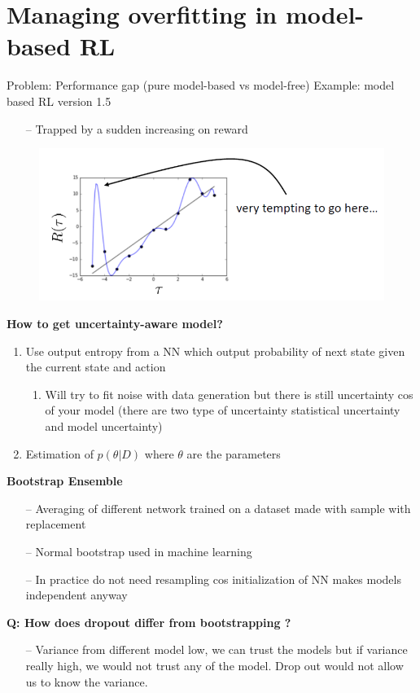 \documentclass{article}
\begin{document}
\section{Managing overfitting in model-based RL}
Problem: Performance gap (pure model-based vs model-free)
Example: model based RL version 1.5
\begin{itemize}
\item[--] Trapped by a sudden increasing on reward
\end{itemize}
\begin{figure}[h]
    \centering
        \includegraphics[width=0.7\linewidth]{img/tp.png}
    \label{fig:tp}
\end{figure}
\textbf{How to get uncertainty-aware model?}
\begin{enumerate}
   \item Use output entropy from a NN which output probability of next state given the current state and action
    \begin{enumerate}
     \item Will try to fit noise with data generation but there is still uncertainty cos of your model (there are two type of uncertainty statistical uncertainty and model uncertainty)
    \end{enumerate}
    \item Estimation of $p(\theta|D)$ where $\theta$ are the parameters
\end{enumerate}

\textbf{Bootstrap Ensemble}
\begin{itemize}
\item[--] Averaging of different network trained on a dataset made with sample with replacement
\item[--] Normal bootstrap used in machine learning
\item[--] In practice do not need resampling cos initialization of NN makes models independent anyway
\end{itemize}

\textbf{Q: How does dropout differ from bootstrapping ?}
\begin{itemize}
\item[--] Variance from different model low, we can trust the models but if variance really high, we would not trust any of the model. Drop out would not allow us to know the variance.
\end{itemize}
\end{document}
